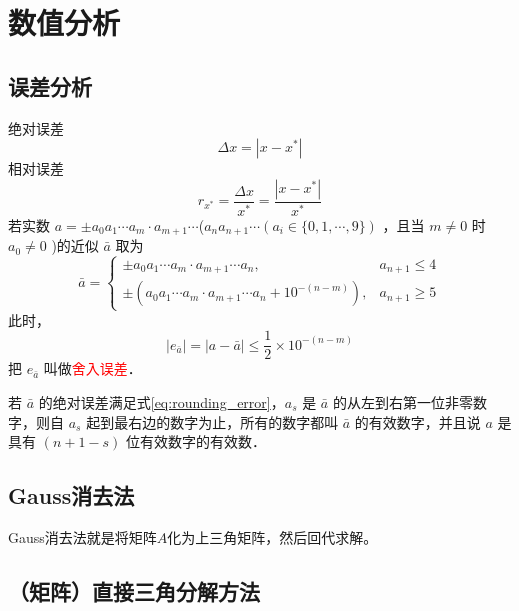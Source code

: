 \setchapterpreamble[u]{\margintoc}
\chapter{数值分析}

\section{误差分析}
绝对误差
\[
    \Delta x = |x - x^*|
\]
相对误差
\[
    r_{x^*} = \frac{\Delta x}{x^*} = \frac{|x - x^*|}{x^*}
\]
若实数 $a= \pm a_0 a_1 \cdots a_m \cdot a_{m+1} \cdots$($ a_n a_{n+1} \cdots(a_i \in\{0,1, \cdots, 9\})$ ，且当 $m \neq 0$ 时 $a_0 \neq 0$ )的近似 $\bar{a}$ 取为
$$
\bar{a}= \begin{cases} \pm a_0 a_1 \cdots a_m \cdot a_{m+1} \cdots a_n, & a_{n+1} \leq 4 \\ \pm\left(a_0 a_1 \cdots a_m \cdot a_{m+1} \cdots a_n+10^{-(n-m)}\right), & a_{n+1} \geq 5\end{cases}
$$
此时，
\begin{equation}\label{eq:rounding_error}
    \left|e_{\bar{a}}\right|=|a-\bar{a}| \leq \frac{1}{2} \times 10^{-(n-m)}
\end{equation}
把 $e_{\bar{a}}$ 叫做\textcolor{red}{舍入误差}．

若 $\bar{a}$ 的绝对误差满足式\ref{eq:rounding_error}，$a_s$ 是 $\bar{a}$ 的从左到右第一位非零数字，则自 $a_s$ 起到最右边的数字为止，所有的数字都叫 $\bar{a}$ 的有效数字，并且说 $a$ 是具有 $(n+1-s)$ 位有效数字的有效数．



\section{Gauss消去法}

Gauss消去法就是将矩阵$A$化为上三角矩阵，然后回代求解。


\section{（矩阵）直接三角分解方法}

